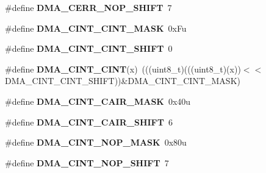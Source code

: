 \begin{DoxyCompactItemize}
\item 
\#define {\bfseries D\+M\+A\+\_\+\+C\+E\+R\+R\+\_\+\+N\+O\+P\+\_\+\+S\+H\+I\+FT}~7\hypertarget{group__DMA__Register__Masks_ga06ff2ec2da47380a89fcd01777bbe400}{}\label{group__DMA__Register__Masks_ga06ff2ec2da47380a89fcd01777bbe400}

\item 
\#define {\bfseries D\+M\+A\+\_\+\+C\+I\+N\+T\+\_\+\+C\+I\+N\+T\+\_\+\+M\+A\+SK}~0x\+Fu\hypertarget{group__DMA__Register__Masks_ga1edbbba2f0260e0467e0a43e04eaaa1d}{}\label{group__DMA__Register__Masks_ga1edbbba2f0260e0467e0a43e04eaaa1d}

\item 
\#define {\bfseries D\+M\+A\+\_\+\+C\+I\+N\+T\+\_\+\+C\+I\+N\+T\+\_\+\+S\+H\+I\+FT}~0\hypertarget{group__DMA__Register__Masks_ga5fd76123ada3ca8b762c83b344994a78}{}\label{group__DMA__Register__Masks_ga5fd76123ada3ca8b762c83b344994a78}

\item 
\#define {\bfseries D\+M\+A\+\_\+\+C\+I\+N\+T\+\_\+\+C\+I\+NT}(x)~(((uint8\+\_\+t)(((uint8\+\_\+t)(x))$<$$<$D\+M\+A\+\_\+\+C\+I\+N\+T\+\_\+\+C\+I\+N\+T\+\_\+\+S\+H\+I\+FT))\&D\+M\+A\+\_\+\+C\+I\+N\+T\+\_\+\+C\+I\+N\+T\+\_\+\+M\+A\+SK)\hypertarget{group__DMA__Register__Masks_ga2aba228e6eca0c2db8b375c15b38cdcb}{}\label{group__DMA__Register__Masks_ga2aba228e6eca0c2db8b375c15b38cdcb}

\item 
\#define {\bfseries D\+M\+A\+\_\+\+C\+I\+N\+T\+\_\+\+C\+A\+I\+R\+\_\+\+M\+A\+SK}~0x40u\hypertarget{group__DMA__Register__Masks_gad5b3c0206e0a7af209d0e9e5e68d2526}{}\label{group__DMA__Register__Masks_gad5b3c0206e0a7af209d0e9e5e68d2526}

\item 
\#define {\bfseries D\+M\+A\+\_\+\+C\+I\+N\+T\+\_\+\+C\+A\+I\+R\+\_\+\+S\+H\+I\+FT}~6\hypertarget{group__DMA__Register__Masks_gaf7dd4a94c052317c29e7bd1bcb82532d}{}\label{group__DMA__Register__Masks_gaf7dd4a94c052317c29e7bd1bcb82532d}

\item 
\#define {\bfseries D\+M\+A\+\_\+\+C\+I\+N\+T\+\_\+\+N\+O\+P\+\_\+\+M\+A\+SK}~0x80u\hypertarget{group__DMA__Register__Masks_ga46266d0d4343c952af65db101c5c9a61}{}\label{group__DMA__Register__Masks_ga46266d0d4343c952af65db101c5c9a61}

\item 
\#define {\bfseries D\+M\+A\+\_\+\+C\+I\+N\+T\+\_\+\+N\+O\+P\+\_\+\+S\+H\+I\+FT}~7\hypertarget{group__DMA__Register__Masks_ga96d721360be562b2a0cf04acf72ebcf9}{}\label{group__DMA__Register__Masks_ga96d721360be562b2a0cf04acf72ebcf9}


\end{DoxyCompactItemize}
